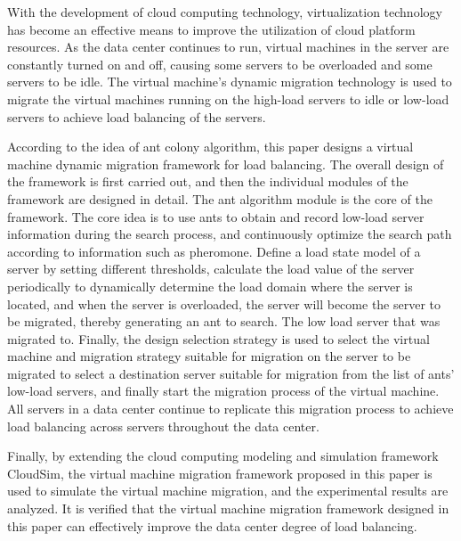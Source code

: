 \begin{enabstract}
With the development of cloud computing technology, virtualization technology has become an effective means to improve the utilization of cloud platform resources. As the data center continues to run, virtual machines in the server are constantly turned on and off, causing some servers to be overloaded and some servers to be idle. The virtual machine's dynamic migration technology is used to migrate the virtual machines running on the high-load servers to idle or low-load servers to achieve load balancing of the servers.

According to the idea of ​​ant colony algorithm, this paper designs a virtual machine dynamic migration framework for load balancing. The overall design of the framework is first carried out, and then the individual modules of the framework are designed in detail. The ant algorithm module is the core of the framework. The core idea is to use ants to obtain and record low-load server information during the search process, and continuously optimize the search path according to information such as pheromone. Define a load state model of a server by setting different thresholds, calculate the load value of the server periodically to dynamically determine the load domain where the server is located, and when the server is overloaded, the server will become the server to be migrated, thereby generating an ant to search. The low load server that was migrated to. Finally, the design selection strategy is used to select the virtual machine and migration strategy suitable for migration on the server to be migrated to select a destination server suitable for migration from the list of ants' low-load servers, and finally start the migration process of the virtual machine. All servers in a data center continue to replicate this migration process to achieve load balancing across servers throughout the data center.

Finally, by extending the cloud computing modeling and simulation framework CloudSim, the virtual machine migration framework proposed in this paper is used to simulate the virtual machine migration, and the experimental results are analyzed. It is verified that the virtual machine migration framework designed in this paper can effectively improve the data center degree of load balancing.

\end{enabstract}
